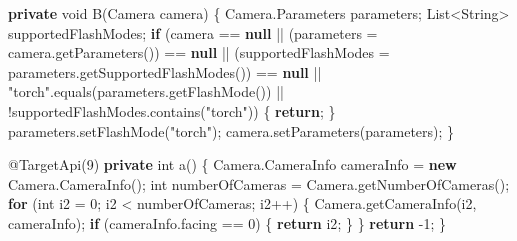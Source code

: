 \documentclass[
]{article}
\newenvironment{Shaded}{}{}
\newcommand{\AttributeTok}[1]{\textcolor[rgb]{0.49,0.56,0.16}{#1}}
\newcommand{\BuiltInTok}[1]{\textcolor[rgb]{0.00,0.50,0.00}{#1}}
\newcommand{\ControlFlowTok}[1]{\textcolor[rgb]{0.00,0.44,0.13}{\textbf{#1}}}
\newcommand{\DataTypeTok}[1]{\textcolor[rgb]{0.56,0.13,0.00}{#1}}
\newcommand{\DecValTok}[1]{\textcolor[rgb]{0.25,0.63,0.44}{#1}}
\newcommand{\FunctionTok}[1]{\textcolor[rgb]{0.02,0.16,0.49}{#1}}
\newcommand{\KeywordTok}[1]{\textcolor[rgb]{0.00,0.44,0.13}{\textbf{#1}}}
\newcommand{\NormalTok}[1]{#1}
\newcommand{\OperatorTok}[1]{\textcolor[rgb]{0.40,0.40,0.40}{#1}}
\newcommand{\StringTok}[1]{\textcolor[rgb]{0.25,0.44,0.63}{#1}}
\begin{document}
\begin{Shaded}
\begin{Highlighting}[]
    \KeywordTok{private} \DataTypeTok{void} \FunctionTok{B}\OperatorTok{(}\NormalTok{Camera camera}\OperatorTok{)} \OperatorTok{\{}
\NormalTok{        Camera}\OperatorTok{.}\FunctionTok{Parameters}\NormalTok{ parameters}\OperatorTok{;}
        \BuiltInTok{List}\OperatorTok{\textless{}}\BuiltInTok{String}\OperatorTok{\textgreater{}}\NormalTok{ supportedFlashModes}\OperatorTok{;}
        \ControlFlowTok{if} \OperatorTok{(}\NormalTok{camera }\OperatorTok{==} \KeywordTok{null} \OperatorTok{||} \OperatorTok{(}\NormalTok{parameters }\OperatorTok{=}\NormalTok{ camera}\OperatorTok{.}\FunctionTok{getParameters}\OperatorTok{())} \OperatorTok{==} \KeywordTok{null} \OperatorTok{||} \OperatorTok{(}\NormalTok{supportedFlashModes }\OperatorTok{=}\NormalTok{ parameters}\OperatorTok{.}\FunctionTok{getSupportedFlashModes}\OperatorTok{())} \OperatorTok{==} \KeywordTok{null} \OperatorTok{||} \StringTok{"torch"}\OperatorTok{.}\FunctionTok{equals}\OperatorTok{(}\NormalTok{parameters}\OperatorTok{.}\FunctionTok{getFlashMode}\OperatorTok{())} \OperatorTok{||} \OperatorTok{!}\NormalTok{supportedFlashModes}\OperatorTok{.}\FunctionTok{contains}\OperatorTok{(}\StringTok{"torch"}\OperatorTok{))} \OperatorTok{\{}
            \ControlFlowTok{return}\OperatorTok{;}
        \OperatorTok{\}}
\NormalTok{        parameters}\OperatorTok{.}\FunctionTok{setFlashMode}\OperatorTok{(}\StringTok{"torch"}\OperatorTok{);}
\NormalTok{        camera}\OperatorTok{.}\FunctionTok{setParameters}\OperatorTok{(}\NormalTok{parameters}\OperatorTok{);}
    \OperatorTok{\}}

    \AttributeTok{@TargetApi}\OperatorTok{(}\DecValTok{9}\OperatorTok{)}
    \KeywordTok{private} \DataTypeTok{int} \FunctionTok{a}\OperatorTok{()} \OperatorTok{\{}
\NormalTok{        Camera}\OperatorTok{.}\FunctionTok{CameraInfo}\NormalTok{ cameraInfo }\OperatorTok{=} \KeywordTok{new}\NormalTok{ Camera}\OperatorTok{.}\FunctionTok{CameraInfo}\OperatorTok{();}
        \DataTypeTok{int}\NormalTok{ numberOfCameras }\OperatorTok{=}\NormalTok{ Camera}\OperatorTok{.}\FunctionTok{getNumberOfCameras}\OperatorTok{();}
        \ControlFlowTok{for} \OperatorTok{(}\DataTypeTok{int}\NormalTok{ i2 }\OperatorTok{=} \DecValTok{0}\OperatorTok{;}\NormalTok{ i2 }\OperatorTok{\textless{}}\NormalTok{ numberOfCameras}\OperatorTok{;}\NormalTok{ i2}\OperatorTok{++)} \OperatorTok{\{}
\NormalTok{            Camera}\OperatorTok{.}\FunctionTok{getCameraInfo}\OperatorTok{(}\NormalTok{i2}\OperatorTok{,}\NormalTok{ cameraInfo}\OperatorTok{);}
            \ControlFlowTok{if} \OperatorTok{(}\NormalTok{cameraInfo}\OperatorTok{.}\FunctionTok{facing} \OperatorTok{==} \DecValTok{0}\OperatorTok{)} \OperatorTok{\{}
                \ControlFlowTok{return}\NormalTok{ i2}\OperatorTok{;}
            \OperatorTok{\}}
        \OperatorTok{\}}
        \ControlFlowTok{return} \OperatorTok{{-}}\DecValTok{1}\OperatorTok{;}
    \OperatorTok{\}}


\end{Highlighting}
\end{Shaded}
\end{document}
